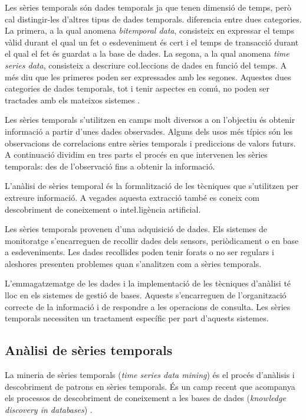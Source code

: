 Les sèries temporals són dades temporals ja que tenen dimensió de temps, però cal distingir-les d'altres tipus de dades temporals. \textcite{assfalg08:thesis} diferencia entre dues categories.  La primera, a la qual anomena \emph{bitemporal data}, consisteix en expressar el temps vàlid durant el qual un fet o esdeveniment és cert i el temps de transacció durant el qual el fet és guardat a la base de dades. La segona, a la qual anomena \emph{time series data}, consisteix a descriure co\l.leccions de dades en funció del temps. A més diu que les primeres poden ser expressades amb les segones. 
Aquestes dues categories de dades temporals, tot i tenir aspectes en comú, no poden ser tractades amb els mateixos sistemes \parencite{schmidt95}.  


Les sèries temporals s'utilitzen en camps molt diversos a on l'objectiu és obtenir informació a partir d'unes dades observades. Alguns dels usos més típics són les observacions de correlacions entre sèries temporals i prediccions de valors futurs. A continuació dividim en tres parts el procés en que intervenen les sèries temporals:  des de l'observació fins a obtenir la informació. 
 
L'anàlisi de sèries temporal és la formalització de les tècniques que s'utilitzen per extreure informació. A vegades aquesta extracció també es coneix com descobriment de coneixement o inte\l.ligència artificial. 

Les sèries temporals provenen d'una adquisició de dades. Els sistemes de monitoratge s'encarreguen de recollir dades dels sensors, periòdicament o en base a esdeveniments. Les dades recollides poden tenir forats o no ser regulars i aleshores presenten problemes quan s'analitzen com a sèries temporals.

L'emmagatzematge de les dades i la implementació de les tècniques d'anàlisi té lloc en els sistemes de gestió de bases. Aquests s'encarreguen de l'organització correcte de la informació i de respondre a les operacions de consulta. Les sèries temporals necessiten un tractament específic per part d'aquests sistemes.



\subsection{Anàlisi de sèries temporals}

La mineria de sèries temporals (\emph{time series data mining}) és el procés d'anàlisis i descobriment de patrons en sèries temporals. És un camp recent que acompanya els processos de descobriment de coneixement a les bases de dades (\emph{knowledge discovery in databases}) \parencite{last01}.


